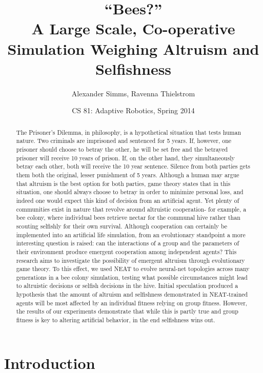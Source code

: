 \documentclass[11pt]{article}
\title  {``Bees?''\\ A Large Scale, Co-operative Simulation 
         Weighing Altruism and Selfishness}
\author {Alexander Simms, Ravenna Thielstrom}
\date   {CS 81: Adaptive Robotics, Spring 2014}
\begin{document}
	\maketitle

	\begin{abstract}

		The Prisoner’s Dilemma, in philosophy, is a hypothetical situation that tests human nature. Two criminals are imprisoned and sentenced for 5 years. If, however, one prisoner should choose to betray the other, he will be set free and the betrayed prisoner will receive 10 years of prison. If, on the other hand, they simultaneously betray each other, both will receive the 10 year sentence. Silence from both parties gets them both the original, lesser punishment of 5 years. Although a human may argue that altruism is the best option for both parties, game theory states that in this situation, one should always choose to betray in order to minimize personal loss, and indeed one would expect this kind of decision from an artificial agent. Yet plenty of communities exist in nature that revolve around altruistic cooperation- for example, a bee colony, where individual bees retrieve nectar for the communal hive rather than scouting selfishly for their own survival. Although cooperation can certainly be implemented into an artificial life simulation, from an evolutionary standpoint a more interesting question is raised: can the interactions of a group and the parameters of their environment produce emergent cooperation among independent agents? This research aims to investigate the possibility of emergent altruism through evolutionary game theory. To this effect, we used NEAT to evolve neural-net topologies across many generations in a bee colony simulation, testing what possible circumstances might lead to altruistic decisions or selfish decisions in the hive. Initial speculation produced a hypothesis that the amount of altruism and selfishness demonstrated in NEAT-trained agents will be most affected by an individual fitness relying on group fitness. However, the results of our experiments demonstrate that while this is partly true and group fitness is key to altering artificial behavior, in the end selfishness wins out.

	\end{abstract}

	\section{Introduction} %
	\label{sec:introduction}
		\lipsum[3-8]
\end{document}

